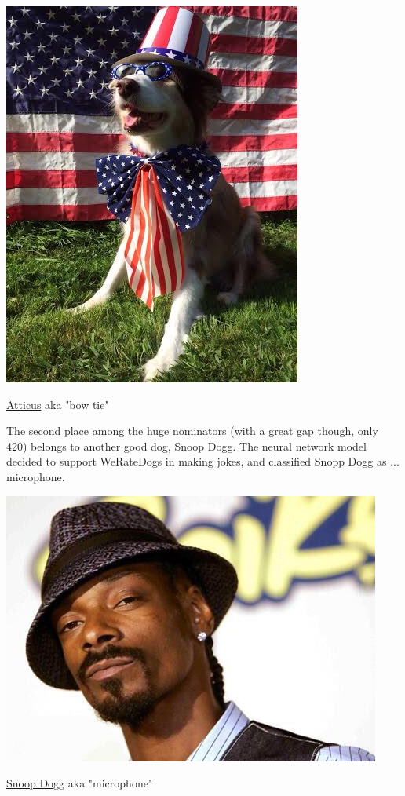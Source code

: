 \documentclass{article}
\begin{document}
\begin{center}
    \includegraphics[scale=0.5]{rating1.jpeg}
    
\href{https://twitter.com/dog_rates/status/749981277374128128/photo/1}{Atticus} aka "bow tie"
\end{center}

The second place among the huge nominators (with a great gap though, only 420) belongs to another good dog, Snoop Dogg. The neural network model decided to support WeRateDogs in making jokes, and classified Snopp Dogg as ... microphone.

\begin{center}
\includegraphics[scale=0.4]{rating2.jpeg}

\href{https://twitter.com/dog_rates/status/670842764863651840/photo/1}{Snoop Dogg} aka "microphone"

\end{center}
\end{document}
